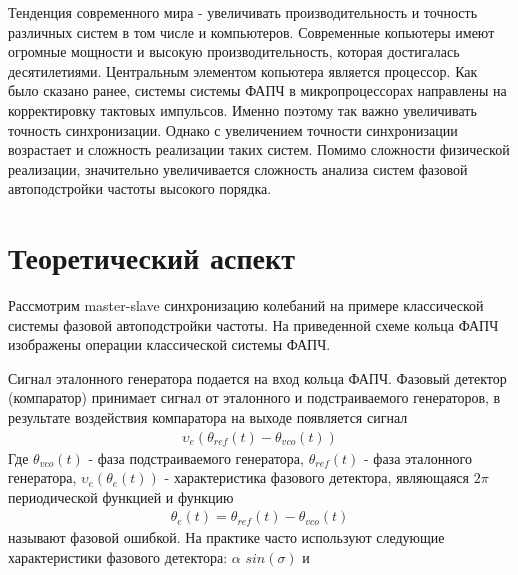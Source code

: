 \documentclass[a4paper,14pt]{extarticle} %
\begin{document}
Тенденция современного мира - увеличивать производительность и точность различных систем в том числе и компьютеров. Современные копьютеры имеют огромные мощности и высокую производительность, которая достигалась десятилетиями. Центральным элементом копьютера является процессор. Как было сказано ранее, системы системы ФАПЧ в микропроцессорах направлены на корректировку тактовых импульсов. Именно поэтому так важно увеличивать точность синхронизации. Однако с увеличением точности синхронизации возрастает и сложность реализации таких систем. Помимо сложности физической реализации, значительно увеличивается сложность анализа систем фазовой автоподстройки частоты высокого порядка.

\newpage
\section{Теоретический аспект}
Рассмотрим master-slave синхронизацию колебаний на примере классической системы фазовой автоподстройки частоты. На приведенной схеме кольца ФАПЧ изображены операции классической системы ФАПЧ.
\begin{center}
\end{center}
Сигнал эталонного генератора подается на вход кольца ФАПЧ. Фазовый детектор (компаратор) принимает сигнал от эталонного и подстраиваемого генераторов, в результате воздействия компаратора на выходе появляется сигнал
 \begin{equation*}
 \begin{aligned}
\upsilon_e(\theta_{ref}(t) - \theta_{vco}(t))
 \end{aligned}
\end{equation*}
Где $\theta_{vco}(t)$ - фаза подстраиваемого генератора, $\theta_{ref}(t)$ - фаза эталонного генератора, $\upsilon_e(\theta_e(t))$ - характеристика фазового детектора, являющаяся $2\pi$ периодической функцией и функцию
 \begin{equation*}
 \begin{aligned}
\theta_e(t) = \theta_{ref}(t) - \theta_{vco}(t)
 \end{aligned}
\end{equation*}
называют фазовой ошибкой. На практике часто используют следующие характеристики фазового детектора: $\alpha$ $sin(\sigma)$ и 
\end{document}
